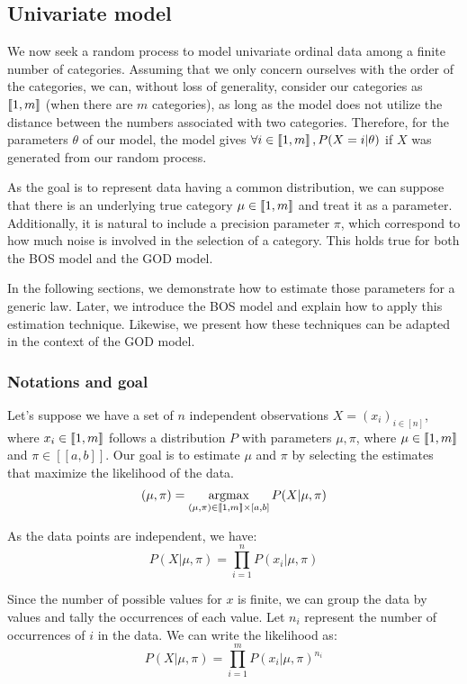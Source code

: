 \subsection{Univariate model}
\label{sec:univariate}

We now seek a random process to model univariate ordinal data among a finite number of categories. Assuming that we only concern ourselves with the order of the categories, we can, without loss of generality, consider our categories as $\left\llbracket1, m\right\rrbracket$ (when there are $m$ categories), as long as the model does not utilize the distance between the numbers associated with two categories. Therefore, for the parameters $\theta$ of our model, the model gives $\forall i \in \left\llbracket1, m\right\rrbracket, P(X = i | \theta)$ if $X$ was generated from our random process.

As the goal is to represent data having a common distribution, we can suppose that there is an underlying true category $\mu \in \left\llbracket1, m\right\rrbracket$ and treat it as a parameter. Additionally, it is natural to include a precision parameter $\pi$, which correspond to how much noise is involved in the selection of a category. This holds true for both the BOS model and the GOD model.

In the following sections, we demonstrate how to estimate those parameters for a generic law. Later, we introduce the BOS model and explain how to apply this estimation technique. Likewise, we present how these techniques can be adapted in the context of the GOD model.


\subsubsection{Notations and goal}

Let's suppose we have a set of $n$ independent observations $X = (x_i)_{i \in [n]}$, where $x_i \in \left\llbracket1, m\right\rrbracket$ follows a distribution $P$ with parameters $\mu, \pi$, where $\mu \in \left\llbracket1, m\right\rrbracket$ and $\pi \in [[a, b]]$. Our goal is to estimate $\mu$ and $\pi$ by selecting the estimates that maximize the likelihood of the data.
$$(\mu, \pi) = \operatorname*{argmax}_{(\mu, \pi) \in \left\llbracket1, m\right\rrbracket \times [a, b]} P(X | \mu, \pi)$$

As the data points are independent, we have:
$$P(X | \mu, \pi) = \prod_{i=1}^n P(x_i | \mu, \pi)$$

Since the number of possible values for $x$ is finite, we can group the data by values and tally the occurrences of each value. Let $n_i$ represent the number of occurrences of $i$ in the data. We can write the likelihood as:
$$P(X | \mu, \pi) = \prod_{i=1}^m P(x_i | \mu, \pi)^{n_i}$$

